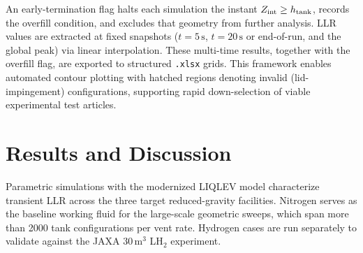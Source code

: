 \documentclass[conf]{new-aiaa}
\begin{document}
An early-termination flag halts each simulation the instant $Z_{\rm int} \ge h_{\rm tank}$, records the overfill condition, and excludes that geometry from further analysis. LLR values are extracted at fixed snapshots ($t=5\,\text{s}$, $t=20\,\text{s}$ or end-of-run, and the global peak) via linear interpolation. These multi-time results, together with the overfill flag, are exported to structured \texttt{.xlsx} grids. This framework enables automated contour plotting with hatched regions denoting invalid (lid-impingement) configurations, supporting rapid down-selection of viable experimental test articles.

\section{Results and Discussion}
\label{sec:results_discussion}

Parametric simulations with the modernized LIQLEV model characterize transient LLR across the three target reduced-gravity facilities. Nitrogen serves as the baseline working fluid for the large-scale geometric sweeps, which span more than 2000 tank configurations per vent rate. Hydrogen cases are run separately to validate against the JAXA $30\,\text{m}^3$ LH$_2$ experiment.




\end{document}

